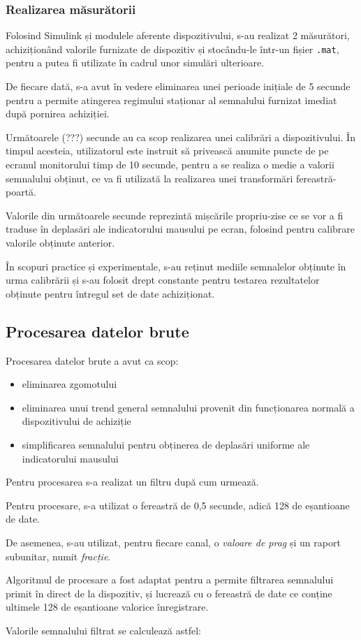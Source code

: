 \documentclass[12pt]{article}
\begin{document}
\begin{multicols}{2}
	\subsubsection*{Realizarea măsurătorii}
	Folosind Simulink și modulele aferente dispozitivului, s-au realizat 2 măsurători, achiziționând valorile furnizate de dispozitiv și stocându-le într-un fișier  {\tt.mat}, pentru a putea fi utilizate în cadrul unor simulări ulterioare.
	
	De fiecare dată, s-a avut în vedere eliminarea unei perioade inițiale de 5 secunde pentru a permite atingerea regimului staționar al semnalului furnizat imediat după pornirea achiziției.
	
	Următoarele (???) secunde au ca scop realizarea unei calibrări a dispozitivului. În timpul acesteia, utilizatorul este instruit să privească anumite puncte de pe ecranul monitorului timp de 10 secunde, pentru a se realiza o medie a valorii semnalului obținut, ce va fi utilizată la realizarea unei transformări fereastră-poartă.
	
	Valorile din următoarele secunde reprezintă mișcările propriu-zise ce se vor a fi traduse în deplasări ale indicatorului mausului pe ecran, folosind pentru calibrare valorile obținute anterior.
	
	În scopuri practice și experimentale, s-au reținut mediile semnalelor obținute în urma calibrării și s-au folosit drept constante pentru testarea rezultatelor obținute pentru întregul set de date achiziționat.
	
	\subsection* {Procesarea datelor brute}
	Procesarea datelor brute a avut ca scop:
	\begin{itemize}[noitemsep,nolistsep]
		\item eliminarea zgomotului
		\item eliminarea unui trend general semnalului provenit din funcționarea normală a dispozitivului de achiziție
		\item simplificarea semnalului pentru obținerea de deplasări uniforme ale indicatorului mausului
	\end{itemize}
	
	Pentru procesarea s-a realizat un filtru după cum urmează. 
	
	Pentru procesare, s-a utilizat o fereastră de 0,5 secunde, adică 128 de eșantioane de date.
	
	De asemenea, s-au utilizat, pentru fiecare canal, o \textit{valoare de prag} și un raport subunitar, numit \textit{fracție}.
	
	Algoritmul de procesare a fost adaptat pentru a permite filtrarea semnalului primit în direct de la dispozitiv, și lucrează cu o fereastră de date ce conține ultimele 128 de eșantioane valorice înregistrare.
	
	Valorile semnalului filtrat se calculează astfel:
	\end{multicols}
\end{document}
